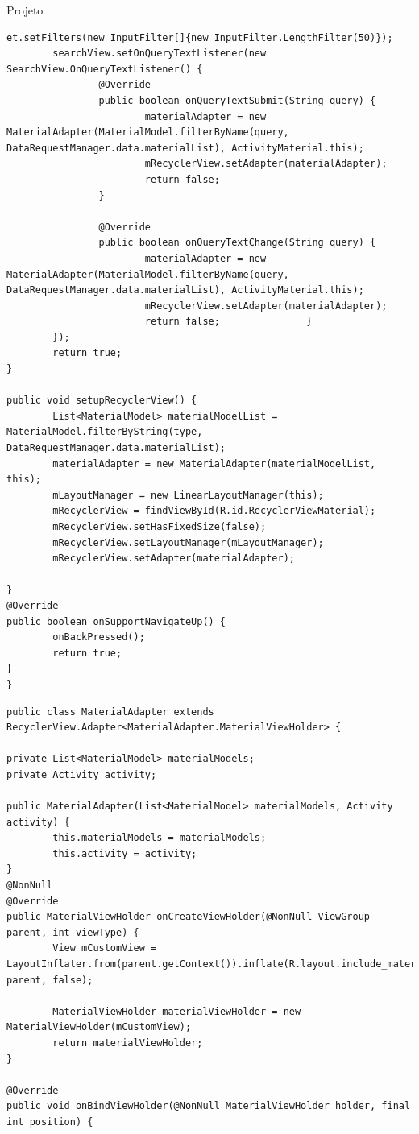 \documentclass[
	12pt,				%
	openright,			%
	twoside,			%
	a4paper,			%
	english,			%
	french,				%
	spanish,			%
	brazil				%
	]{abntex2}
\begin{document}
\begin{chapter}{Projeto}
\begin{lstlisting}[numbers=none,
basicstyle=\small,
caption={ActivityMaterial.java},
title={ActivityMaterial.java},
label={ActivityMaterial.java}]
et.setFilters(new InputFilter[]{new InputFilter.LengthFilter(50)});
		searchView.setOnQueryTextListener(new SearchView.OnQueryTextListener() {
				@Override
				public boolean onQueryTextSubmit(String query) {
						materialAdapter = new MaterialAdapter(MaterialModel.filterByName(query, DataRequestManager.data.materialList), ActivityMaterial.this);
						mRecyclerView.setAdapter(materialAdapter);
						return false;
				}

				@Override
				public boolean onQueryTextChange(String query) {
						materialAdapter = new MaterialAdapter(MaterialModel.filterByName(query, DataRequestManager.data.materialList), ActivityMaterial.this);
						mRecyclerView.setAdapter(materialAdapter);
						return false;				}
		});
		return true;
}

public void setupRecyclerView() {
		List<MaterialModel> materialModelList = MaterialModel.filterByString(type, DataRequestManager.data.materialList);
		materialAdapter = new MaterialAdapter(materialModelList, this);
		mLayoutManager = new LinearLayoutManager(this);
		mRecyclerView = findViewById(R.id.RecyclerViewMaterial);
		mRecyclerView.setHasFixedSize(false);
		mRecyclerView.setLayoutManager(mLayoutManager);
		mRecyclerView.setAdapter(materialAdapter);

}
@Override
public boolean onSupportNavigateUp() {
		onBackPressed();
		return true;
}
}
\end{lstlisting}


\begin{lstlisting}[numbers=none,
basicstyle=\small,
caption={MaterialAdapter.java},
title={MaterialAdapter.java},
label={MaterialAdapter.java}] 
public class MaterialAdapter extends RecyclerView.Adapter<MaterialAdapter.MaterialViewHolder> {

private List<MaterialModel> materialModels;
private Activity activity;

public MaterialAdapter(List<MaterialModel> materialModels, Activity activity) {
		this.materialModels = materialModels;
		this.activity = activity;
}
@NonNull
@Override
public MaterialViewHolder onCreateViewHolder(@NonNull ViewGroup parent, int viewType) {
		View mCustomView = LayoutInflater.from(parent.getContext()).inflate(R.layout.include_material, parent, false);

		MaterialViewHolder materialViewHolder = new MaterialViewHolder(mCustomView);
		return materialViewHolder;
}

@Override
public void onBindViewHolder(@NonNull MaterialViewHolder holder, final int position) {


\end{lstlisting}
\end{chapter}
\end{document}
